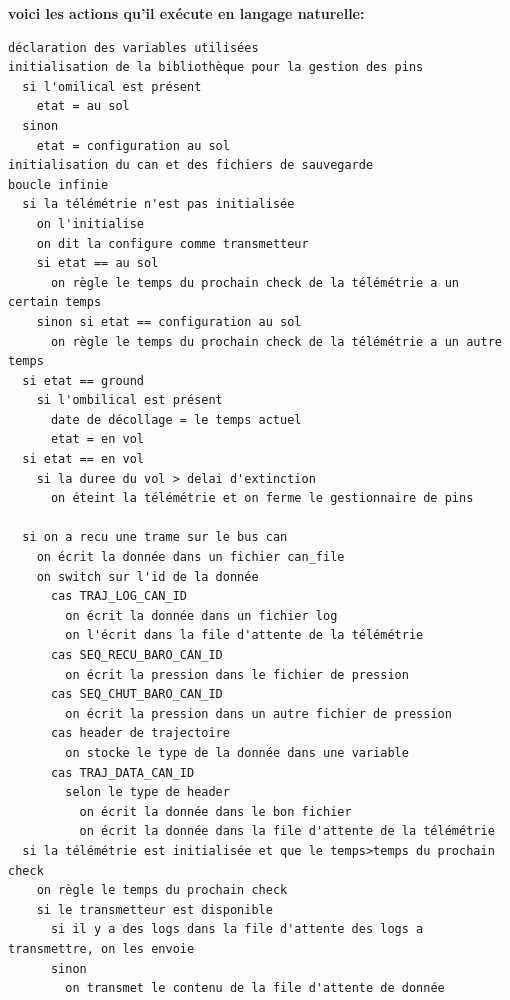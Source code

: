 \documentclass{article}
\begin{document}
\textbf{voici les actions qu'il exécute en langage naturelle:}
\begin{verbatim}
déclaration des variables utilisées
initialisation de la bibliothèque pour la gestion des pins
  si l'omilical est présent
    etat = au sol
  sinon
    etat = configuration au sol
initialisation du can et des fichiers de sauvegarde
boucle infinie
  si la télémétrie n'est pas initialisée
    on l'initialise
    on dit la configure comme transmetteur
    si etat == au sol
      on règle le temps du prochain check de la télémétrie a un certain temps
    sinon si etat == configuration au sol
      on règle le temps du prochain check de la télémétrie a un autre temps
  si etat == ground
    si l'ombilical est présent
      date de décollage = le temps actuel
      etat = en vol
  si etat == en vol
    si la duree du vol > delai d'extinction
      on éteint la télémétrie et on ferme le gestionnaire de pins
  
  si on a recu une trame sur le bus can
    on écrit la donnée dans un fichier can_file
    on switch sur l'id de la donnée
      cas TRAJ_LOG_CAN_ID
        on écrit la donnée dans un fichier log
        on l'écrit dans la file d'attente de la télémétrie
      cas SEQ_RECU_BARO_CAN_ID
        on écrit la pression dans le fichier de pression
      cas SEQ_CHUT_BARO_CAN_ID
        on écrit la pression dans un autre fichier de pression
      cas header de trajectoire
        on stocke le type de la donnée dans une variable
      cas TRAJ_DATA_CAN_ID
        selon le type de header
          on écrit la donnée dans le bon fichier
          on écrit la donnée dans la file d'attente de la télémétrie
  si la télémétrie est initialisée et que le temps>temps du prochain check
    on règle le temps du prochain check
    si le transmetteur est disponible
      si il y a des logs dans la file d'attente des logs a transmettre, on les envoie
      sinon
        on transmet le contenu de la file d'attente de donnée
\end{verbatim}
\end{document}
